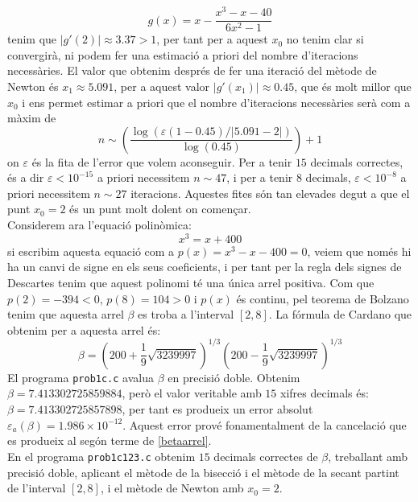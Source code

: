 \documentclass[12pt]{article}
\begin{document}
	\begin{equation}\label{pfix}
		g(x)=x-\dfrac{x^3-x-40}{6x^2-1}
	\end{equation}
	tenim que $|g'(2)|\approx3.37>1$, per tant per a aquest $x_0$ no tenim clar si convergirà, ni podem fer una estimació a priori del nombre d'iteracions necessàries. El valor que obtenim després de fer una iteració del mètode de Newton és $x_1\approx5.091$, per a aquest valor $|g'(x_1)|\approx0.45$, que és molt millor que $x_0$ i ens permet estimar a priori que el nombre d'iteracions necessàries serà com a màxim de
	\begin{equation}\label{iteracions}
		n\sim\left( \dfrac{\log(\varepsilon(1-0.45)/|5.091-2|)}{\log(0.45)}\right)+1
	\end{equation}
	on $\varepsilon$ és la fita de l'error que volem aconseguir. Per a tenir $15$ decimals correctes, és a dir $\varepsilon<10^{-15}$ a priori necessitem $n\sim47$, i per a tenir $8$ decimals, $\varepsilon<10^{-8}$ a priori necessitem $n\sim27$ iteracions. Aquestes fites són tan elevades degut a que el punt $x_0=2$ és un punt molt dolent on començar.\\
	
	
	Considerem ara l'equació polinòmica:
	\begin{equation}\label{pol:2}
		x^3=x+400
	\end{equation}
	si escribim aquesta equació com a $p(x)=x^3-x-400=0$, veiem que només hi ha un canvi de signe en els seus coeficients, i per tant per la regla dels signes de Descartes tenim que aquest polinomi té una única arrel positiva. Com que $p(2)=-394<0$, $p(8)=104>0$ i $p(x)$ és continu, pel teorema de Bolzano tenim que aquesta arrel $\beta$ es troba a l'interval $[2,8]$. La fórmula de Cardano que obtenim per a aquesta arrel és:
	\begin{equation}\label{betaarrel}
		\beta=\left( 200+\frac{1}{9}\sqrt{3239997}\right)^{1/3}\left( 200-\frac{1}{9}\sqrt{3239997}\right)^{1/3}
	\end{equation}
	El programa \texttt{prob1c.c} avalua $\beta$ en precisió doble. Obtenim $\beta=7.413302725859884$, però el valor veritable amb $15$ xifres decimals és: $\beta=7.413302725857898$, per tant es produeix un error absolut $\varepsilon_a(\beta)=1.986\times10^{-12}$. Aquest error prové fonamentalment de la cancelació que es produeix al segón terme de \eqref{betaarrel}.\\
	
	En el programa \texttt{prob1c123.c} obtenim $15$ decimals correctes de $\beta$, treballant amb precisió doble, aplicant el mètode de la bisecció i el mètode de la secant partint de l'interval $[2,8]$, i el mètode de Newton amb $x_0=2$.
	
\end{document}
